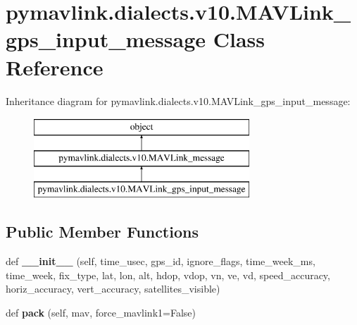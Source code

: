 \hypertarget{classpymavlink_1_1dialects_1_1v10_1_1MAVLink__gps__input__message}{}\section{pymavlink.\+dialects.\+v10.\+M\+A\+V\+Link\+\_\+gps\+\_\+input\+\_\+message Class Reference}
\label{classpymavlink_1_1dialects_1_1v10_1_1MAVLink__gps__input__message}
Inheritance diagram for pymavlink.\+dialects.\+v10.\+M\+A\+V\+Link\+\_\+gps\+\_\+input\+\_\+message\+:\begin{figure}[H]
\begin{center}
\leavevmode
\includegraphics[height=3.000000cm]{classpymavlink_1_1dialects_1_1v10_1_1MAVLink__gps__input__message}
\end{center}
\end{figure}
\subsection*{Public Member Functions}
\begin{DoxyCompactItemize}
\item 
\mbox{\label{classpymavlink_1_1dialects_1_1v10_1_1MAVLink__gps__input__message_a01fc92af9713c2a5c55b7d059e81ff74}} 
def {\bfseries \+\_\+\+\_\+init\+\_\+\+\_\+} (self, time\+\_\+usec, gps\+\_\+id, ignore\+\_\+flags, time\+\_\+week\+\_\+ms, time\+\_\+week, fix\+\_\+type, lat, lon, alt, hdop, vdop, vn, ve, vd, speed\+\_\+accuracy, horiz\+\_\+accuracy, vert\+\_\+accuracy, satellites\+\_\+visible)
\item 
\mbox{\label{classpymavlink_1_1dialects_1_1v10_1_1MAVLink__gps__input__message_ac8f5ff750bec37faf089721e682d48e4}} 
def {\bfseries pack} (self, mav, force\+\_\+mavlink1=False)
\end{DoxyCompactItemize}
